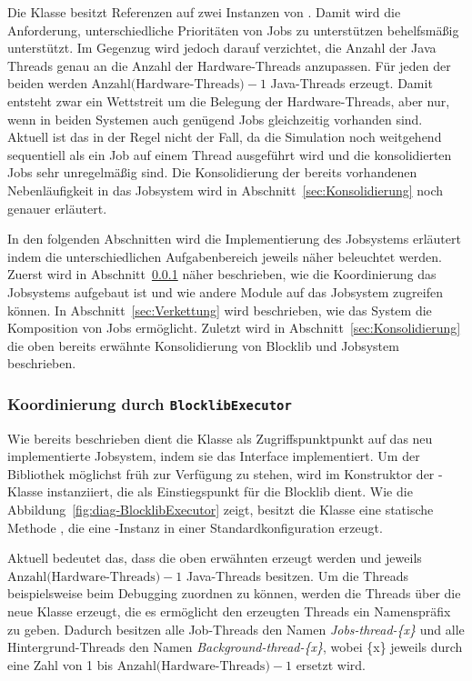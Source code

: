 Die Klasse besitzt Referenzen auf zwei Instanzen von . Damit wird die Anforderung, unterschiedliche Prioritäten von Jobs zu unterstützen behelfsmäßig unterstützt. Im Gegenzug wird jedoch darauf verzichtet, die Anzahl der Java Threads genau an die Anzahl der Hardware-Threads anzupassen. Für jeden der beiden  werden $\text{Anzahl(Hardware-Threads)} - 1$ Java-Threads erzeugt. Damit entsteht zwar ein Wettstreit um die Belegung der Hardware-Threads, aber nur, wenn in beiden Systemen auch genügend Jobs gleichzeitig vorhanden sind. Aktuell ist das in der Regel nicht der Fall, da die Simulation noch weitgehend sequentiell als ein Job auf einem Thread ausgeführt wird und die konsolidierten Jobs sehr unregelmäßig sind. Die Konsolidierung der bereits vorhandenen Nebenläufigkeit in das Jobsystem wird in Abschnitt~\ref{sec:Konsolidierung} noch genauer erläutert. 

In den folgenden Abschnitten wird die Implementierung des Jobsystems erläutert indem die unterschiedlichen Aufgabenbereich jeweils näher beleuchtet werden. Zuerst wird in Abschnitt~\ref{sec:Koordinierung} näher beschrieben, wie die Koordinierung das Jobsystems aufgebaut ist und wie andere Module auf das Jobsystem zugreifen können. In Abschnitt~\ref{sec:Verkettung} wird beschrieben, wie das System die Komposition von Jobs ermöglicht. Zuletzt wird in Abschnitt~\ref{sec:Konsolidierung} die oben bereits erwähnte Konsolidierung von Blocklib und Jobsystem beschrieben.

\subsubsection{Koordinierung durch \texttt{BlocklibExecutor}}\label{sec:Koordinierung}

Wie bereits beschrieben dient die Klasse  als Zugriffspunktpunkt auf das neu implementierte Jobsystem, indem sie das Interface  implementiert. Um der Bibliothek möglichst früh zur Verfügung zu stehen, wird  im Konstruktor der -Klasse instanziiert, die als Einstiegspunkt für die Blocklib dient. Wie die Abbildung~\ref{fig:diag-BlocklibExecutor} zeigt, besitzt die Klasse  eine statische Methode , die eine -Instanz in einer Standardkonfiguration erzeugt.

Aktuell bedeutet das, dass die oben erwähnten  erzeugt werden und jeweils $\text{Anzahl(Hardware-Threads)} - 1$ Java-Threads besitzen. Um die Threads beispielsweise beim Debugging zuordnen zu können, werden die Threads über die neue Klasse  erzeugt, die es ermöglicht den erzeugten Threads ein Namenspräfix zu geben. Dadurch besitzen alle Job-Threads den Namen \emph{Jobs-thread-\{x\}} und alle Hintergrund-Threads den Namen \emph{Background-thread-\{x\}}, wobei \{x\} jeweils durch eine Zahl von 1 bis $\text{Anzahl(Hardware-Threads)} - 1$ ersetzt wird.

